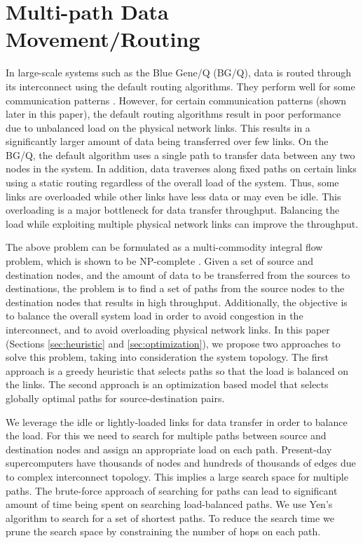 \section{Multi-path Data Movement/Routing}
\label{sec:approach}

In large-scale systems such as the Blue Gene/Q (BG/Q), data is routed through its interconnect using the default routing algorithms. They perform well for some communication patterns \cite{Chen:BGQ}. However, for certain communication patterns (shown later in this paper), the default routing algorithms result in poor performance due to unbalanced load on the physical network links. This results in a significantly larger amount of data being transferred over few links. On the BG/Q,  the default algorithm uses a single path to transfer data between any two nodes in the system. In addition, data traverses along fixed paths on certain links using a static routing regardless of the overall load of the system. Thus, some links are overloaded while other links have less data or may even be idle. This overloading is a major bottleneck for data transfer throughput. Balancing the load while exploiting multiple physical network links can improve the throughput. 

The above problem can be formulated as a multi-commodity integral flow problem, which is shown to be NP-complete \cite{even1975}. Given a set of source and destination nodes, and the amount of data to be transferred from the sources to destinations, the problem is to find a set of paths from the source nodes to the destination nodes that results in high throughput. Additionally, the objective is to balance the overall system load in order to avoid congestion in the interconnect, and to avoid overloading physical network links. In this paper (Sections \ref{sec:heuristic} and \ref{sec:optimization}), we propose two approaches to solve this problem, taking into consideration the system topology. The first approach is a greedy heuristic that selects paths so that the load is balanced on the links. The second approach is an optimization based model that selects globally optimal paths for source-destination pairs. 

We leverage the idle or lightly-loaded links for data transfer in order to balance the load. For this we need to search for multiple paths between source and destination nodes and assign an appropriate load on each path. Present-day supercomputers have thousands of nodes and hundreds of thousands of edges due to complex interconnect topology. This implies a large search space for multiple paths. The brute-force approach of searching for paths can lead to significant amount of time being spent on searching load-balanced paths. We use Yen's algorithm \cite{Yen:Kpath} to search for a set of shortest paths. To reduce the search time we prune the search space by constraining the number of hops on each path. 

